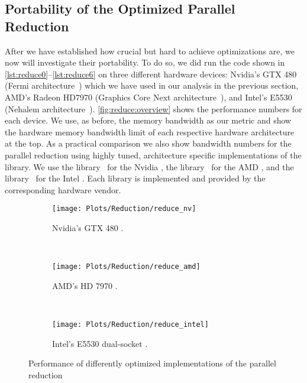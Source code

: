 \subsection{Portability of the Optimized Parallel Reduction}
After we have established how crucial but hard to achieve optimizations are, we now will investigate their portability.
To do so, we did run the code shown in \autoref{lst:reduce0}--\autoref{lst:reduce6} on three different hardware devices:
Nvidia's GTX 480 (Fermi \GPU architecture~\cite{CUDAFermi2009}) which we have used in our analysis in the previous section, AMD's Radeon HD7970 (Graphics Core Next \GPU architecture~\cite{AMDGCN2012}), and Intel's E5530 \CPU (Nehalem \CPU architecture~\cite{IntelNehalem2008}).
\autoref{fig:reduce:overview} shows the performance numbers for each device.
We use, as before, the memory bandwidth as our metric and show the hardware memory bandwidth limit of each respective hardware architecture at the top.
As a practical comparison we also show bandwidth numbers for the parallel reduction using highly tuned, architecture specific implementations of the \BLAS library.
We use the \CUBLAS library~\cite{cuBLAS} for the Nvidia \GPU, the \clBLAS library~\cite{clBLAS} for the AMD \GPU, and the \MKL library~\cite{MKL} for the Intel \CPU.
Each library is implemented and provided by the corresponding hardware vendor.

\begin{figure}[p]
  \centering
\begin{subfigure}{\linewidth}
  \texttt{[image: Plots/Reduction/reduce\_nv]}
  \caption{Nvidia's GTX 480 \GPU.}
  \label{fig:reduce:nvidia}
\end{subfigure}\\
\begin{subfigure}{\linewidth}
  \texttt{[image: Plots/Reduction/reduce\_amd]}
  \caption{AMD's HD 7970 \GPU.}
  \label{fig:reduce:amd}
\end{subfigure}\\
\begin{subfigure}{\linewidth}
  \texttt{[image: Plots/Reduction/reduce\_intel]}
    \caption{Intel's E5530 dual-socket \CPU.}
  \label{fig:reduce:intel}
\end{subfigure}
  \caption[Performance of optimized implementations of the parallel reduction]{Performance of differently optimized implementations of the parallel reduction}
  \label{fig:reduce:overview}
\end{figure}


